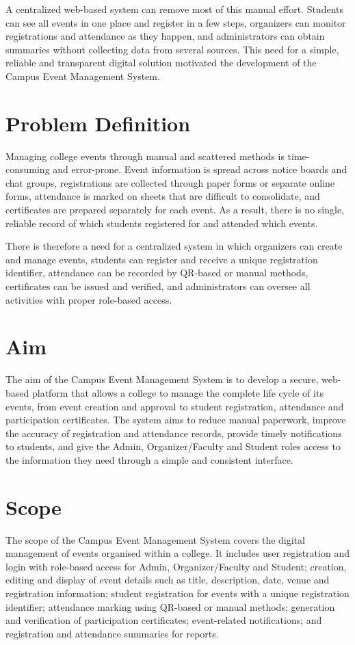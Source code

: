 \documentclass[12pt,a4paper]{report}
\begin{document}
A centralized web-based system can remove most of this manual effort. Students can see all events in one place and register in a few steps, organizers can monitor registrations and attendance as they happen, and administrators can obtain summaries without collecting data from several sources. This need for a simple, reliable and transparent digital solution motivated the development of the Campus Event Management System.

\section{Problem Definition}
Managing college events through manual and scattered methods is time-consuming and error-prone. Event information is spread across notice boards and chat groups, registrations are collected through paper forms or separate online forms, attendance is marked on sheets that are difficult to consolidate, and certificates are prepared separately for each event. As a result, there is no single, reliable record of which students registered for and attended which events.

There is therefore a need for a centralized system in which organizers can create and manage events, students can register and receive a unique registration identifier, attendance can be recorded by QR-based or manual methods, certificates can be issued and verified, and administrators can oversee all activities with proper role-based access.

\section{Aim}
The aim of the Campus Event Management System is to develop a secure, web-based platform that allows a college to manage the complete life cycle of its events, from event creation and approval to student registration, attendance and participation certificates. The system aims to reduce manual paperwork, improve the accuracy of registration and attendance records, provide timely notifications to students, and give the Admin, Organizer/Faculty and Student roles access to the information they need through a simple and consistent interface.

\section{Scope}
The scope of the Campus Event Management System covers the digital management of events organised within a college. It includes user registration and login with role-based access for Admin, Organizer/Faculty and Student; creation, editing and display of event details such as title, description, date, venue and registration information; student registration for events with a unique registration identifier; attendance marking using QR-based or manual methods; generation and verification of participation certificates; event-related notifications; and registration and attendance summaries for reports.
\end{document}

